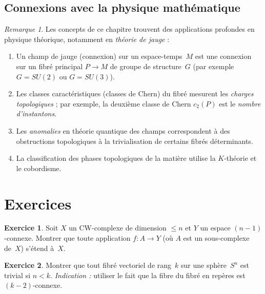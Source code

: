 \documentclass[12pt,a4paper,openany]{book}
\theoremstyle{definition}
\newtheorem{exercice}{Exercice}[chapter]
\theoremstyle{plain}
\theoremstyle{remark}
\newtheorem{remarque}[definition]{Remarque}
\begin{document}
\subsection{Connexions avec la physique mathématique}\label{subsec:physique}

\begin{remarque}\label{rem:physique}
  Les concepts de ce chapitre trouvent des applications profondes en physique
  théorique, notamment en \emph{théorie de jauge} :
  \begin{enumerate}[label=(\roman*)]
    \item Un champ de jauge (connexion) sur un espace-temps~$M$ est une connexion
          sur un fibré principal $P \to M$ de groupe de structure~$G$
          (par exemple $G = SU(2)$ ou $G = SU(3)$).
    \item Les classes caractéristiques (classes de Chern) du fibré mesurent les
          \emph{charges topologiques} ; par exemple, la deuxième classe de Chern
          $c_2(P)$ est le \emph{nombre d'instantons}.
    \item Les \emph{anomalies} en théorie quantique des
          champs correspondent à des obstructions topologiques à la trivialisation
          de certains fibrés déterminants.
    \item La classification des phases topologiques de la matière utilise la
          $K$-théorie et le cobordisme.
  \end{enumerate}
\end{remarque}

\section{Exercices}\label{sec:exo-obstruction}

\begin{exercice}\label{exo:obstruction-1}
  Soit $X$ un CW-complexe de dimension $\leq n$ et $Y$ un espace $(n{-}1)$-connexe.
  Montrer que toute application $f \colon A \to Y$ (où $A$ est un sous-complexe
  de~$X$) s'étend à~$X$.
\end{exercice}

\begin{exercice}\label{exo:obstruction-2}
  Montrer que tout fibré vectoriel de rang~$k$ sur une sphère~$S^n$ est trivial si
  $n < k$. \emph{Indication :} utiliser le fait que la fibre du fibré en repères
  est $(k{-}2)$-connexe.
\end{exercice}
\end{document}

